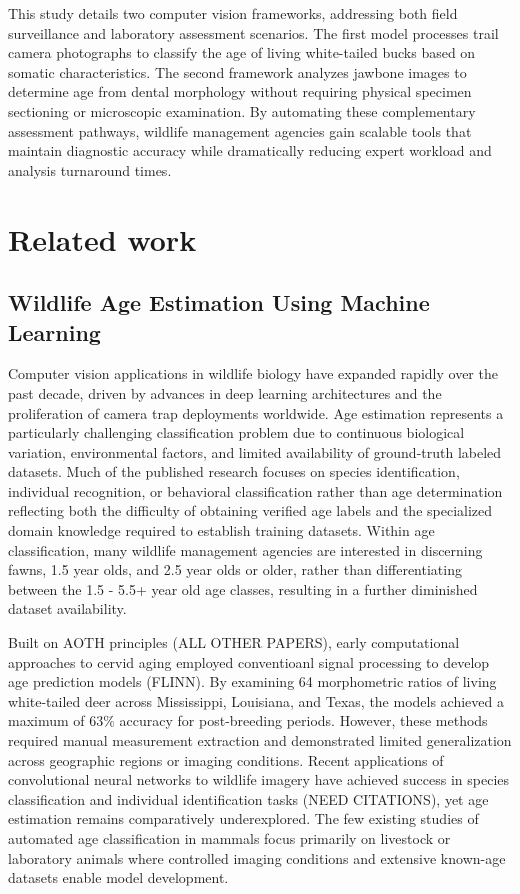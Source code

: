 \documentclass{iopjournal}
\begin{document}
This study details two computer vision frameworks, addressing both field surveillance and laboratory assessment scenarios. The first model processes trail camera photographs to classify the age of living white-tailed bucks based on somatic characteristics. The second framework analyzes jawbone images to determine age from dental morphology without requiring physical specimen sectioning or microscopic examination. By automating these complementary assessment pathways, wildlife management agencies gain scalable tools that maintain diagnostic accuracy while dramatically reducing expert workload and analysis turnaround times.

\section{Related work}
\subsection{Wildlife Age Estimation Using Machine Learning}
Computer vision applications in wildlife biology have expanded rapidly over the past decade, driven by advances in deep learning architectures and the proliferation of camera trap deployments worldwide. Age estimation represents a particularly challenging classification problem due to continuous biological variation, environmental factors, and limited availability of ground-truth labeled datasets. Much of the published research focuses on species identification, individual recognition, or behavioral classification rather than age determination reflecting both the difficulty of obtaining verified age labels and the specialized domain knowledge required to establish training datasets. Within age classification, many wildlife management agencies are interested in discerning fawns, 1.5 year olds, and 2.5 year olds or older, rather than differentiating between the 1.5 - 5.5+ year old age classes, resulting in a further diminished dataset availability.
 
Built on AOTH principles (ALL OTHER PAPERS), early computational approaches to cervid aging employed conventioanl signal processing to develop age prediction models (FLINN). By examining 64 morphometric ratios of living white-tailed deer across Mississippi, Louisiana, and Texas, the models achieved a maximum of $63\%$ accuracy for post-breeding periods. However, these methods required manual measurement extraction and demonstrated limited generalization across geographic regions or imaging conditions. Recent applications of convolutional neural networks to wildlife imagery have achieved success in species classification and individual identification tasks (NEED CITATIONS), yet age estimation remains comparatively underexplored. The few existing studies of automated age classification in mammals focus primarily on livestock or laboratory animals where controlled imaging conditions and extensive known-age datasets enable model development.
\end{document}
